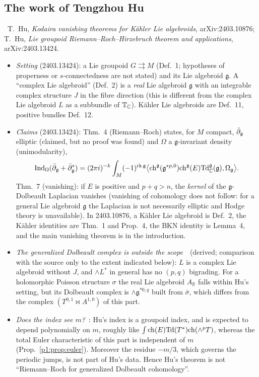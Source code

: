 \subsection{The work of Tengzhou Hu}
\tC\ T.\ Hu, \emph{Kodaira vanishing theorems for K\"ahler Lie algebroids}, arXiv:2403.10876;\\ T.\ Hu, \emph{Lie groupoid Riemann--Roch--Hirzebruch theorem and applications}, arXiv:2403.13424.
\begin{itemize}
\item \emph{Setting} (2403.13424): a Lie groupoid $G\rightrightarrows M$ (Def.~1; hypotheses of properness or $s$-connectedness are not stated) and its Lie algebroid $\mathfrak g$. A ``complex Lie algebroid'' (Def.~2) is a \emph{real} Lie algebroid $\mathfrak g$ with an integrable complex structure $J$ in the fibre direction (this is different from the complex Lie algebroid $L$ as a subbundle of $\mathbb T_\mathbb C$). Kähler Lie algebroids are Def.~11, positive bundles Def.~12.
\item \emph{Claims} (2403.13424): Thm.~4 (Riemann--Roch) states, for $M$ compact, $\bar\partial_{\mathfrak g}$ elliptic (claimed, but no proof was found) and $\Omega$ a $\mathfrak g$-invariant density (unimodularity),
\[\mathrm{Ind}_\Omega(\bar\partial_{\mathfrak g}+\bar\partial_{\mathfrak g}^*)=(2\pi i)^{-k}\int_M(-1)^{\mathrm{rk}\,\mathfrak g}\bigl\langle\mathrm{ch}^{\mathfrak g}(\mathfrak g^{*p,0})\mathrm{ch}^{\mathfrak g}(E)\mathrm{Td}^{\mathfrak g}_\mathbb C(\mathfrak g),\Omega_{\mathfrak g}\bigr\rangle.\]
Thm.~7 (vanishing): if $E$ is positive and $p+q>n$, the \emph{kernel} of the $\mathfrak g$-Dolbeault Laplacian vanishes (vanishing of cohomology does not follow: for a general Lie algebroid $\mathfrak g$ the Laplacian is not necessarily elliptic and Hodge theory is unavailable). In 2403.10876, a K\"ahler Lie algebroid is Def.~2, the K\"ahler identities are Thm.~1 and Prop.~4, the BKN identity is Lemma~4, and the main vanishing theorem is in the introduction.
\item \emph{The generalized Dolbeault complex is outside the scope}\ \tP\ (derived; comparison with the source only to the extent indicated below): $L$ is a complex Lie algebroid without $J$, and $\wedge L^*$ in general has no $(p,q)$ bigrading. For a holomorphic Poisson structure $\sigma$ the real Lie algebroid $A_{\mathbb R}$ falls within Hu's setting, but its Dolbeault complex is $\wedge\mathfrak g^{*0,q}$ built from $\bar\sigma$, which differs from the complex $(T^{0,1}\bowtie A^{1,0})$ of this part.
\item \emph{Does the index see $m$?}\ \tK: Hu's index is a groupoid index, and is expected to depend polynomially on $m$, roughly like $\int\mathrm{ch}(E)\mathrm{Td}(T^*)\mathrm{ch}(\wedge^pT)$, whereas the total Euler characteristic of this part is independent of $m$ (Prop.~\ref{p1:prop:euler}). Moreover the residue $-m/3$, which governs the periodic jumps, is not part of Hu's data. Hence Hu's theorem is not ``Riemann--Roch for generalized Dolbeault cohomology''.

\end{itemize}
